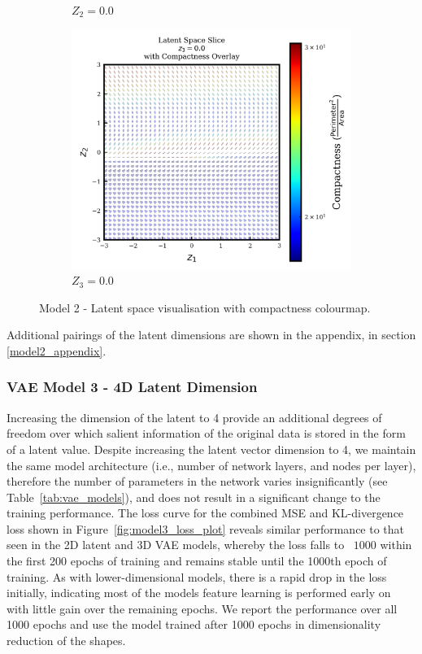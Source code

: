\documentclass{article}
\begin{document}
\begin{figure}[H]
\begin{subfigure}{0.3\textwidth}
    \caption{$Z_2=0.0$}
    \label{fig:model2_fixz2_latent}
  \end{subfigure}
  \hfill
  \begin{subfigure}{0.3\textwidth}
    \centering
    \includegraphics[height=0.2\textheight]{figures/VAEmodels/model2/fix_z3_0.0.png}
    \caption{$Z_3=0.0$}
    \label{fig:model2_fixz3_latent}
  \end{subfigure}
  \caption{Model 2 - Latent space visualisation with compactness colourmap.}
  \label{fig:model2_latent_visualisations}
\end{figure}

Additional pairings of the latent dimensions are shown in the appendix, in section \ref{model2_appendix}.

\subsubsection{VAE Model 3 - 4D Latent Dimension}
Increasing the dimension of the latent to 4 provide an additional degrees of freedom over which salient information of the original data is stored in the form of a latent value. Despite increasing the latent vector dimension to 4, we maintain the same model architecture (i.e., number of network layers, and nodes per layer), therefore the number of parameters in the network varies insignificantly (see Table~\ref{tab:vae_models}), and does not result in a significant change to the training performance. The loss curve for the combined MSE and KL-divergence loss shown in Figure~\ref{fig:model3_loss_plot} reveals similar performance to that seen in the 2D latent and 3D VAE models, whereby the loss falls to ~$1000$ within the first 200 epochs of training and remains stable until the 1000th epoch of training. As with lower-dimensional models, there is a rapid drop in the loss initially, indicating most of the models feature learning is performed early on with little gain over the remaining epochs. We report the performance over all 1000 epochs and use the model trained after 1000 epochs in dimensionality reduction of the shapes.
\end{document}
